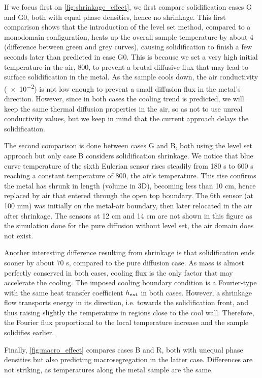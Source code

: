 If we focus first on \cref{fig:shrinkage_effect}, we first compare solidification cases G and G0, both with equal phase densities, hence no shrinkage.
This first comparison shows that the introduction of the level set method, compared to a monodomain configuration, heats up
the overall sample temperature by about \SI{4}{\udegC} (difference between green and grey curves), causing solidification to finish a few seconds later than predicted in case G0.
This is because we set a very high initial temperature in the air, \SI{800}{\udegC}, to prevent a brutal diffusive flux that may lead to surface solidification
in the metal. As the sample cools down, the air conductivity (\SI{e-2}{\uconductivity}) is not low enough to prevent a small diffusion flux in the metal's direction.
However, since in both cases the cooling trend is predicted, we will keep the same thermal diffusion properties in the air, so as not to use unreal conductivity values,
but we keep in mind that the current approach delays the solidification.

The second comparison is done between cases G and B, both using the level set approach but only case B considers solidification shrinkage.
We notice that blue curve temperature of the sixth 
Eulerian sensor rises steadily from 180 s to 600 s reaching a constant temperature of \SI{800}{\udegC}, the air's temperature. 
This rise confirms the metal has shrunk in length (volume in 3D),
becoming less than 10 cm, hence replaced by air that entered through the open top boundary.
The 6$\text{th}$ sensor (at 100 mm) was initially on the metal-air boundary, then later relocated in the air after shrinkage.
The sensors at 12 cm and 14 cm are not shown in this figure as the simulation done for the pure diffusion without level set, the air domain does not exist.

Another interesting difference resulting from shrinkage is that solidification ends sooner by about 70 s, compared to the pure diffusion case.
As mass is almost perfectly conserved in both cases, cooling flux is the only factor that may accelerate the cooling. The imposed cooling boundary condition
is a Fourier-type with the same heat transfer coefficient $h_{\text{ext}}$ in both cases. However, a shrinkage flow transports energy in its direction, i.e. towards the solidification
front, and thus raising slightly the temperature in regions close to the cool wall. Therefore, the Fourier flux proportional to the local temperature
increase and the sample solidifies earlier. 

Finally, \cref{fig:macro_effect} compares cases B and R, both with unequal phase densities but also predicting macrosegregation in the latter case. 
Differences are not striking, as temperatures along the metal sample are the same. 

